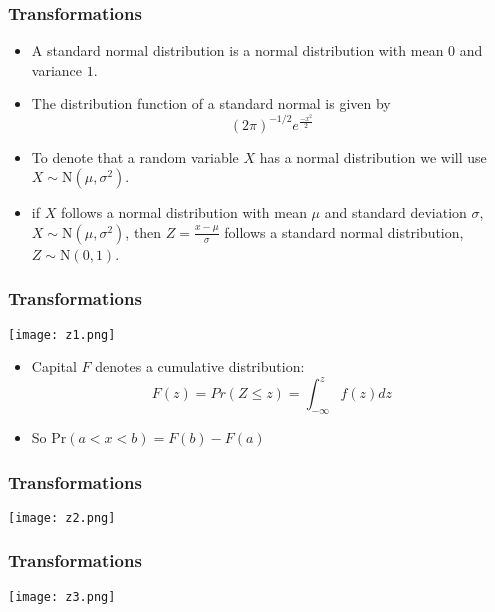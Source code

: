 \documentclass[xcolor=dvipsnames, 9pt]{beamer} %
\begin{document}
\begin{frame}
\frametitle{Transformations}
\begin{itemize}
	\itemsep\setlength{1em}
	\item A standard normal distribution is a normal distribution with mean $0$ and variance $1$.
	\item The distribution function of a standard normal is given by $$ (2 \pi)^{-1/2} e^{ \frac{-x^2}{2} }$$
	\item To denote that a random variable $X$ has a normal distribution we will use $X \sim \textrm{N}(\mu, \sigma^2)$.
	\item \textcolor{dark_red}{if} $X$ follows a normal distribution with mean $\mu$ and standard deviation $\sigma$, $X \sim \textrm{N}(\mu, \sigma^2)$, \textcolor{dark_red}{then} $Z = \frac{x - \mu}{\sigma}$ follows a standard normal distribution, $Z \sim \textrm{N}(0, 1)$.
\end{itemize}
\end{frame}

\begin{frame}
\frametitle{Transformations}
\begin{center}
\texttt{[image: z1.png]}
\end{center}
\vspace{-2em}
\begin{itemize}
\item Capital $F$ denotes a cumulative distribution: $$F(z) = Pr (Z \leq z) = \int_{- \infty}^z f(z) dz$$
\item So $\textrm{Pr}(a < x < b) = F(b) - F(a)$
\end{itemize}
\end{frame}

\begin{frame}
\frametitle{Transformations}
\begin{center}
\texttt{[image: z2.png]}
\end{center}
\end{frame}

\begin{frame}
\frametitle{Transformations}
\begin{center}
\texttt{[image: z3.png]}
\end{center}
\end{frame}
\end{document}
